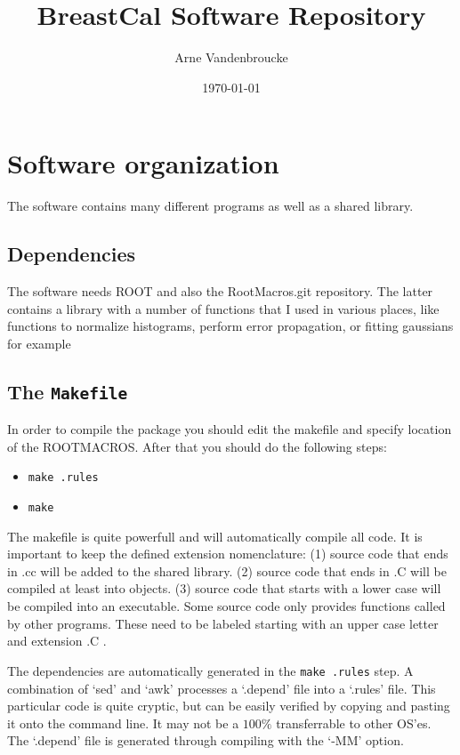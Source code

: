 \documentclass[12pt]{article}
\title{BreastCal Software Repository}
\author{Arne Vandenbroucke}
\date{\today}
\newcommand{\bi}{\begin{itemize}}
\newcommand{\ei}{\end{itemize}}
\begin{document}
\sf
\maketitle
{}
\newpage
\tableofcontents

\newpage
\section{Software organization}
The software contains many different programs as well as a shared library. 

\subsection{Dependencies}
The software needs ROOT and also the RootMacros.git repository. The latter contains a library with a number of functions that I used in various places, like functions to normalize histograms, perform error propagation, or fitting gaussians for example

\subsection{The {\tt Makefile}}
In order to compile the package you should edit the makefile and specify location of the ROOTMACROS. After that you should do the following steps:
\bi
\item {\tt make .rules}
\item {\tt make}
\ei
The makefile is quite powerfull and will automatically compile all code. It is important to keep the defined extension nomenclature: (1) source code that ends in .cc will be added to the shared library. (2) source code that ends in .C will be compiled at least into objects. (3) source code that starts with a lower case will be compiled into an executable. Some source code only provides functions called by other programs. These need to be labeled starting with an upper case letter and extension .C . 

The dependencies are automatically generated in the {\tt make .rules} step. A combination of `sed' and `awk' processes a `.depend' file into a `.rules' file. This particular code is quite cryptic, but can be easily verified by copying and pasting it onto the command line. It may not be a $100\%$ transferrable to other OS'es. The `.depend' file is generated through compiling with the `-MM' option. 
\end{document}
